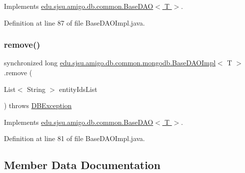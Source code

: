 Implements \hyperlink{interfaceedu_1_1sjsu_1_1amigo_1_1db_1_1common_1_1_base_d_a_o_a37db1a13eee71618f11b7e07d3b13ac4}{edu.\+sjsu.\+amigo.\+db.\+common.\+Base\+D\+A\+O$<$ T $>$}.



Definition at line 87 of file Base\+D\+A\+O\+Impl.\+java.

\mbox{\label{classedu_1_1sjsu_1_1amigo_1_1db_1_1common_1_1mongodb_1_1_base_d_a_o_impl_ac8ca9075d687d809293f54749f92c7e9}} 
\subsubsection{\texorpdfstring{remove()}{remove()}}
{\footnotesize\ttfamily synchronized long \hyperlink{classedu_1_1sjsu_1_1amigo_1_1db_1_1common_1_1mongodb_1_1_base_d_a_o_impl}{edu.\+sjsu.\+amigo.\+db.\+common.\+mongodb.\+Base\+D\+A\+O\+Impl}$<$ T $>$.remove (\begin{DoxyParamCaption}\item[{List$<$ String $>$}]{entity\+Ids\+List }\end{DoxyParamCaption}) throws \hyperlink{classedu_1_1sjsu_1_1amigo_1_1db_1_1common_1_1_d_b_exception}{D\+B\+Exception}}



Implements \hyperlink{interfaceedu_1_1sjsu_1_1amigo_1_1db_1_1common_1_1_base_d_a_o_ad41557807ba9feaeebff9705ce68478d}{edu.\+sjsu.\+amigo.\+db.\+common.\+Base\+D\+A\+O$<$ T $>$}.



Definition at line 81 of file Base\+D\+A\+O\+Impl.\+java.



\subsection{Member Data Documentation}
\mbox{\label{classedu_1_1sjsu_1_1amigo_1_1db_1_1common_1_1mongodb_1_1_base_d_a_o_impl_ac405c66365add92a549f7c386248fca4}} 
